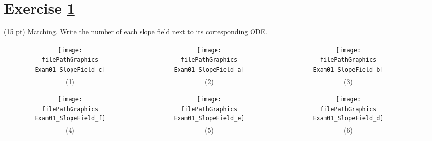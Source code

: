 


%
%
%
%


\section{Exercise \ref{sec : Math211 Summer2019 Exam1 Q2}}
\label{sec : Math211 Summer2019 Exam1 Q2}

(15 pt) Matching. Write the number of each slope field next to its corresponding ODE.

\vspace{.25in}

\begin{center}
\begin{tabular}{c c c c c c c}
\texttt{[image: \\filePathGraphics Exam01\_SlopeField\_c]}
&
\hspace{.15in}
&
\texttt{[image: \\filePathGraphics Exam01\_SlopeField\_a]}
&
\hspace{.15in}
&
\texttt{[image: \\filePathGraphics Exam01\_SlopeField\_b]}
\\
(1)
&
&
(2)
&
&
(3)
\\
\\
\\
\texttt{[image: \\filePathGraphics Exam01\_SlopeField\_f]}
&
\hspace{.15in}
&
\texttt{[image: \\filePathGraphics Exam01\_SlopeField\_e]}
&
\hspace{.15in}
&
\texttt{[image: \\filePathGraphics Exam01\_SlopeField\_d]}
\\
(4)
&
&
(5)
&
&
(6)
\end{tabular}
\end{center}

\vspace{.25in}

